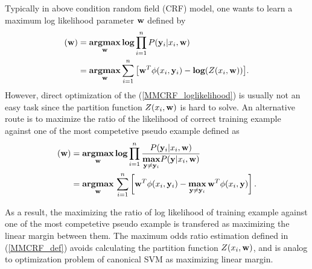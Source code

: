 \documentclass[english]{tktltiki}
\newcommand{\argmax}{\textbf{argmax}}
\newcommand{\yb}{{\bf y}}
\newcommand{\wb}{{\bf w}}
\begin{document}
Typically in above condition random field (CRF) model, one wants to learn a maximum log likelihood parameter $\wb$ defined by
\begin{align}
(\wb) &= \underset{\wb}{\operatorname{\argmax}} \, \textbf{log} \prod_{i=1}^{n}{P(\yb_i|x_i,\wb)} \nonumber \\
 &= \underset{\wb}{\operatorname{\argmax}} \sum_{i=1}^{n}{\left[\wb^T\phi(x_i,\yb_i)-\textbf{log}(Z(x_i, \wb))\right]}.
\label{MMCRF_loglikelihood}
\end{align}
However, direct optimization of the (\ref{MMCRF_loglikelihood}) is usually not an easy task since the partition function $Z(x_i,\wb)$ is hard to solve. An alternative route is to maximize the ratio of the likelihood of correct training example against one of the most competetive pseudo example defined as
\begin{align}
(\wb) &= \underset{\wb}{\operatorname{\argmax}} \, \textbf{log} \prod_{i=1}^{n}\frac{P(\yb_i|x_i,\wb)}{\underset{\yb \ne \yb_i}{\operatorname{\bf max}}P(\yb|x_i,\wb)}
\nonumber \\
 &= \underset{\wb}{\operatorname{\argmax}} \, \sum_{i=1}^{n}\left[\wb^T\phi(x_i,\yb_i) - \underset{\yb \ne \yb_i}{\operatorname{\bf max}} \, \wb^T\phi(x_i,\yb)\right] .
\label{MMCRF_def} 
\end{align}

As a result, the maximizing the ratio of log likelihood of training example against one of the most competetive pseudo example is transfered as maximizing the linear margin between them. The maximum odds ratio \cite{nurminen95} estimation defined in (\ref{MMCRF_def}) avoids calculating the partition function $Z(x_i,\wb)$, and is analog to optimization problem of canonical SVM as maximizing linear margin. 
\end{document}
